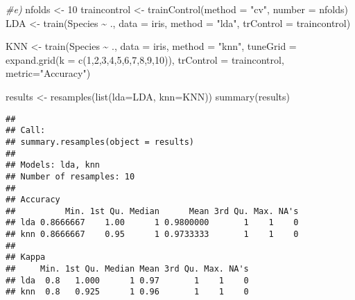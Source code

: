\documentclass[
]{article}
\newenvironment{Shaded}{\begin{snugshade}}{\end{snugshade}}
\newcommand{\AttributeTok}[1]{\textcolor[rgb]{0.77,0.63,0.00}{#1}}
\newcommand{\CommentTok}[1]{\textcolor[rgb]{0.56,0.35,0.01}{\textit{#1}}}
\newcommand{\DecValTok}[1]{\textcolor[rgb]{0.00,0.00,0.81}{#1}}
\newcommand{\FunctionTok}[1]{\textcolor[rgb]{0.00,0.00,0.00}{#1}}
\newcommand{\NormalTok}[1]{#1}
\newcommand{\OtherTok}[1]{\textcolor[rgb]{0.56,0.35,0.01}{#1}}
\newcommand{\SpecialCharTok}[1]{\textcolor[rgb]{0.00,0.00,0.00}{#1}}
\newcommand{\StringTok}[1]{\textcolor[rgb]{0.31,0.60,0.02}{#1}}
\begin{document}
\begin{Shaded}
\begin{Highlighting}[]
\CommentTok{\#e)}
\NormalTok{nfolds }\OtherTok{\textless{}{-}} \DecValTok{10}
\NormalTok{traincontrol }\OtherTok{\textless{}{-}} \FunctionTok{trainControl}\NormalTok{(}\AttributeTok{method =} \StringTok{"cv"}\NormalTok{,}
                            \AttributeTok{number =}\NormalTok{ nfolds)}
\NormalTok{LDA }\OtherTok{\textless{}{-}} \FunctionTok{train}\NormalTok{(Species }\SpecialCharTok{\textasciitilde{}}\NormalTok{ ., }
             \AttributeTok{data =}\NormalTok{ iris, }
             \AttributeTok{method =} \StringTok{"lda"}\NormalTok{, }
             \AttributeTok{trControl =}\NormalTok{ traincontrol)}

\NormalTok{KNN }\OtherTok{\textless{}{-}} \FunctionTok{train}\NormalTok{(Species }\SpecialCharTok{\textasciitilde{}}\NormalTok{ ., }
             \AttributeTok{data =}\NormalTok{ iris, }
             \AttributeTok{method =} \StringTok{"knn"}\NormalTok{, }
             \AttributeTok{tuneGrid   =} \FunctionTok{expand.grid}\NormalTok{(}\AttributeTok{k =} \FunctionTok{c}\NormalTok{(}\DecValTok{1}\NormalTok{,}\DecValTok{2}\NormalTok{,}\DecValTok{3}\NormalTok{,}\DecValTok{4}\NormalTok{,}\DecValTok{5}\NormalTok{,}\DecValTok{6}\NormalTok{,}\DecValTok{7}\NormalTok{,}\DecValTok{8}\NormalTok{,}\DecValTok{9}\NormalTok{,}\DecValTok{10}\NormalTok{)),}
             \AttributeTok{trControl =}\NormalTok{ traincontrol, }
             \AttributeTok{metric=}\StringTok{"Accuracy"}\NormalTok{)}

\NormalTok{results }\OtherTok{\textless{}{-}} \FunctionTok{resamples}\NormalTok{(}\FunctionTok{list}\NormalTok{(}\AttributeTok{lda=}\NormalTok{LDA, }\AttributeTok{knn=}\NormalTok{KNN))}
\FunctionTok{summary}\NormalTok{(results)}
\end{Highlighting}
\end{Shaded}

\begin{verbatim}
## 
## Call:
## summary.resamples(object = results)
## 
## Models: lda, knn 
## Number of resamples: 10 
## 
## Accuracy 
##          Min. 1st Qu. Median      Mean 3rd Qu. Max. NA's
## lda 0.8666667    1.00      1 0.9800000       1    1    0
## knn 0.8666667    0.95      1 0.9733333       1    1    0
## 
## Kappa 
##     Min. 1st Qu. Median Mean 3rd Qu. Max. NA's
## lda  0.8   1.000      1 0.97       1    1    0
## knn  0.8   0.925      1 0.96       1    1    0
\end{verbatim}
\end{document}
